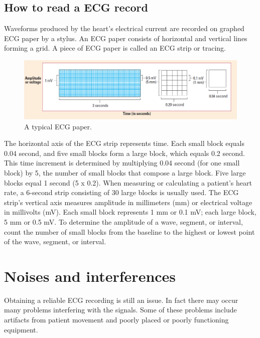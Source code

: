 \subsection{How to read a ECG record}
Waveforms produced by the heart’s electrical current are recorded on graphed ECG paper by a stylus. An ECG paper consists of horizontal and vertical lines forming a grid. A piece of ECG paper is called an ECG strip or tracing.
\begin{figure}[ht!]
	\centering
	\includegraphics[width=130mm]{figures/ch2/8.png}
	\caption{A typical ECG paper.}
	\label{fig2.8}
\end{figure}
The horizontal axis of the ECG strip represents time. Each small block equals 0.04 second, and five small blocks form a large block, which equals 0.2 second. This time increment is determined by multiplying 0.04 second (for one small block) by 5, the number of small blocks that compose a large block. Five large blocks equal 1 second (5 x 0.2). When measuring or calculating a patient’s heart rate, a 6-second strip consisting of 30 large blocks is usually used. The ECG strip’s vertical axis measures amplitude in millimeters (mm) or electrical voltage in millivolts (mV). Each small block represents 1 mm or 0.1 mV; each large block, 5 mm or 0.5 mV. To determine the amplitude of a wave, segment, or interval, count the number of small blocks from the baseline to the highest or lowest point of the wave, segment, or interval.

\section{Noises and interferences}
Obtaining a reliable ECG recording is still an issue. In fact there may occur many problems interfering with the signals. Some of these problems include artifacts from patient movement and poorly placed or poorly functioning equipment.

